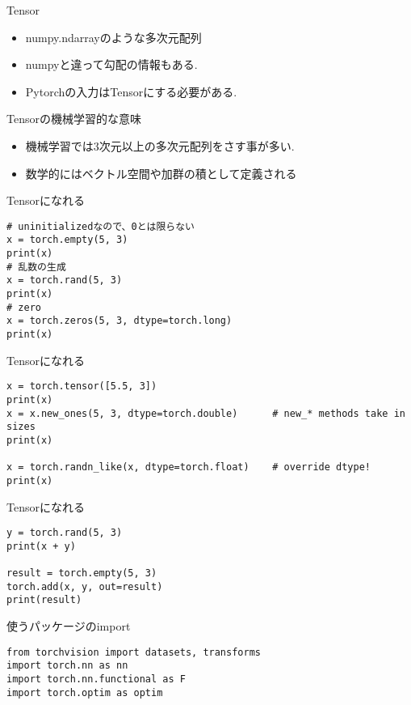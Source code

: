 \begin{frame}[fragile]{Tensor}
\begin{itemize}
  \item numpy.ndarrayのような多次元配列
  \item numpyと違って勾配の情報もある.
  \item Pytorchの入力はTensorにする必要がある.
\end{itemize}

Tensorの機械学習的な意味
\begin{itemize}
  \item 機械学習では3次元以上の多次元配列をさす事が多い.
  \item 数学的にはベクトル空間や加群の積として定義される
\end{itemize}

\end{frame}
\begin{frame}[fragile]{Tensorになれる}

\begin{verbatim}
# uninitializedなので、0とは限らない
x = torch.empty(5, 3)
print(x)
# 乱数の生成
x = torch.rand(5, 3)
print(x)
# zero
x = torch.zeros(5, 3, dtype=torch.long)
print(x)
\end{verbatim}
\end{frame}


\begin{frame}[fragile]{Tensorになれる}
\begin{verbatim}
x = torch.tensor([5.5, 3])
print(x)
x = x.new_ones(5, 3, dtype=torch.double)      # new_* methods take in sizes
print(x)
​
x = torch.randn_like(x, dtype=torch.float)    # override dtype!
print(x)
\end{verbatim}

\end{frame}
\begin{frame}[fragile]{Tensorになれる}
\begin{verbatim}
y = torch.rand(5, 3)
print(x + y)
​
result = torch.empty(5, 3)
torch.add(x, y, out=result)
print(result)
\end{verbatim}
\end{frame}


\begin{frame}[fragile]{使うパッケージのimport}
\begin{verbatim}
from torchvision import datasets, transforms
import torch.nn as nn
import torch.nn.functional as F
import torch.optim as optim
\end{verbatim}
\end{frame}


